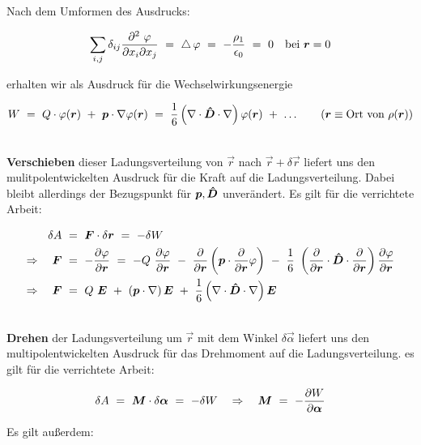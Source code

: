 Nach dem Umformen des Ausdrucks:

\begin{equation*}
\sum_{i,j} \delta_{ij}\frac{\partial^2 \ \varphi}{\partial x_i \partial x_j} \ = \ \laplace\varphi  \ = \ -\frac{\rho_1}{\epsilon_0}  \ = \ 0 \quad \text{bei } \vec{r}=0
\end{equation*}

erhalten wir als Ausdruck für die Wechselwirkungsenergie

\begin{equation*}
W \ = \ Q\cdot\varphi(\vec{r}) \ + \ \vec{p}\cdot\nabla\varphi(\vec{r})  \ = \ \frac{1}{6}\left(\nabla\cdot\tens{D}\cdot\nabla\right)\varphi(\vec{r}) \ + \ \ldots \qquad(\vec{r}\equiv \text{Ort von }\rho(\vec{r}))
\end{equation*}

\ \\
\textbf{Verschieben} dieser Ladungsverteilung von $\vec{r}$ nach $\vec{r} + \delta\vec{r}$ liefert uns den mulitpolentwickelten Ausdruck für die Kraft auf die Ladungsverteilung. Dabei bleibt allerdings der Bezugspunkt für $\bm{p},\bm{\hat{D}}$ unverändert. Es gilt für die verrichtete Arbeit:

\begin{align*}
\delta A \ &= \ \vec{F} \cdot \delta\vec{r} \ = \ -\delta W \\
\Rightarrow \quad \vec{F}  \ &= \  -\pdiff{\varphi}{\vec{r}}  \ = \ -Q\ \pdiff{\varphi}{\vec{r}} \ - \ \pdiff{}{\vec{r}} \left(\vec{p}\cdot\pdiff{}{\vec{r}}\varphi\right) \ - \ \frac{1}{6} \ \left(\pdiff{}{\vec{r}}\cdot\tens{D}\cdot\pdiff{}{\vec{r}}\right)\pdiff{\varphi}{\vec{r}}\\
\Rightarrow \quad \vec{F} \ &= \ Q \ \vec{E} \ + \ \left(\vec{p}\cdot\nabla\right)\vec{E} \ + \ \frac{1}{6}\left(\nabla\cdot\tens{D}\cdot\nabla\right)\vec{E}
\end{align*}

\ \\
\textbf{Drehen} der Ladungsverteilung um $\vec{r}$ mit dem Winkel $\delta\vec{\alpha}$ liefert uns den multipolentwickelten Ausdruck für das Drehmoment auf die Ladungsverteilung. es gilt für die verrichtete Arbeit:

\begin{equation*}
\delta A  \ = \ \vec{M}\cdot\delta\vec{\alpha}  \ = \ - \delta W \quad\Rightarrow \quad \vec{M}  \ = \ - \pdiff{W}{\vec{\alpha}}
\end{equation*}

Es gilt außerdem:

